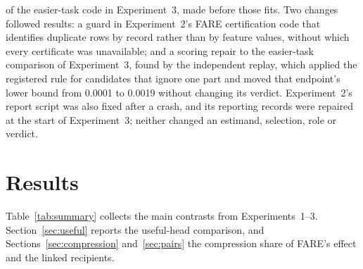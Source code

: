 \documentclass[10pt]{article}
\begin{document}
of the easier-task code in Experiment~3, made before those fits. Two changes followed results: a guard in
Experiment~2's FARE certification code that identifies duplicate rows by record rather than by feature values, without
which every certificate was unavailable; and a scoring repair to the easier-task comparison of Experiment~3, found by
the independent replay, which applied the registered rule for candidates that ignore one part and moved that endpoint's
lower bound from 0.0001 to 0.0019 without changing its verdict. Experiment~2's report script was also fixed after a
crash, and its reporting records were repaired at the start of Experiment~3; neither changed an estimand, selection,
role or verdict.

\section{Results}\label{sec:results}

Table~\ref{tab:summary} collects the main contrasts from Experiments~1--3. Section~\ref{sec:useful} reports the
useful-head comparison, and Sections~\ref{sec:compression} and~\ref{sec:pairs} the compression share of FARE's effect
and the linked recipients.
\end{document}
